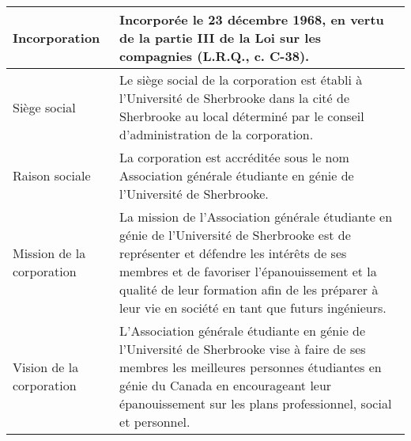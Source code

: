  


 


 

\begin{tabular}[c]{m{}|m{}} 

\hline 

Incorporation & Incorporée le 23 décembre 1968, en vertu de la partie III de la Loi sur les compagnies (L.R.Q., c. C-38).\\\hline 

Siège social & Le siège social de la corporation est établi à l’Université de Sherbrooke dans la cité de Sherbrooke au local déterminé par le conseil d'administration de la corporation.\\\hline 

Raison sociale & La corporation est accréditée sous le nom Association générale étudiante en génie de l’Université de Sherbrooke.\\\hline 

Mission de la corporation & La mission de l'Association générale étudiante en génie de l'Université de Sherbrooke est de représenter et défendre les intérêts de ses membres et de favoriser l'épanouissement et la qualité de leur formation afin de les préparer à leur vie en société en tant que futurs ingénieurs.\\\hline 

Vision de la corporation & L'Association générale  étudiante en génie de l'Université de Sherbrooke vise à faire de ses membres les meilleures personnes étudiantes en génie du Canada en encourageant leur épanouissement sur les plans professionnel, social et personnel.\\\hline 

\end{tabular} 

 




